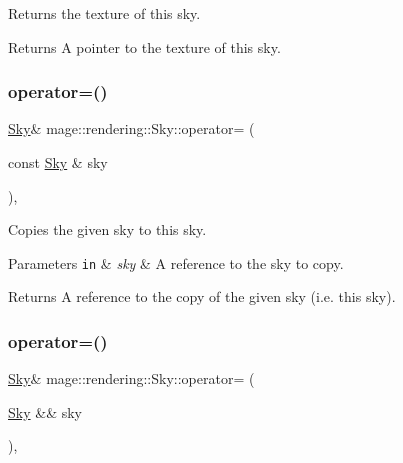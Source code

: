 Returns the texture of this sky.

\begin{DoxyReturn}{Returns}
A pointer to the texture of this sky. 
\end{DoxyReturn}
\hypertarget{classmage_1_1rendering_1_1_sky_a9654c598bd30fee1b0892b0abf7b7c96}{}\label{classmage_1_1rendering_1_1_sky_a9654c598bd30fee1b0892b0abf7b7c96} 
\subsubsection{\texorpdfstring{operator=()}{operator=()}\hspace{0.1cm}{\footnotesize\ttfamily [1/2]}}
{\footnotesize\ttfamily \hyperlink{classmage_1_1rendering_1_1_sky}{Sky}\& mage\+::rendering\+::\+Sky\+::operator= (\begin{DoxyParamCaption}\item[{const \hyperlink{classmage_1_1rendering_1_1_sky}{Sky} \&}]{sky }\end{DoxyParamCaption})\hspace{0.3cm}{\ttfamily [default]}, {\ttfamily [noexcept]}}

Copies the given sky to this sky.


\begin{DoxyParams}[1]{Parameters}
\mbox{\tt in}  & {\em sky} & A reference to the sky to copy. \\
\hline
\end{DoxyParams}
\begin{DoxyReturn}{Returns}
A reference to the copy of the given sky (i.\+e. this sky). 
\end{DoxyReturn}
\hypertarget{classmage_1_1rendering_1_1_sky_a01b1145f77fdab81e7dce93f6a524b45}{}\label{classmage_1_1rendering_1_1_sky_a01b1145f77fdab81e7dce93f6a524b45} 
\subsubsection{\texorpdfstring{operator=()}{operator=()}\hspace{0.1cm}{\footnotesize\ttfamily [2/2]}}
{\footnotesize\ttfamily \hyperlink{classmage_1_1rendering_1_1_sky}{Sky}\& mage\+::rendering\+::\+Sky\+::operator= (\begin{DoxyParamCaption}\item[{\hyperlink{classmage_1_1rendering_1_1_sky}{Sky} \&\&}]{sky }\end{DoxyParamCaption})\hspace{0.3cm}{\ttfamily [default]}, {\ttfamily [noexcept]}}

